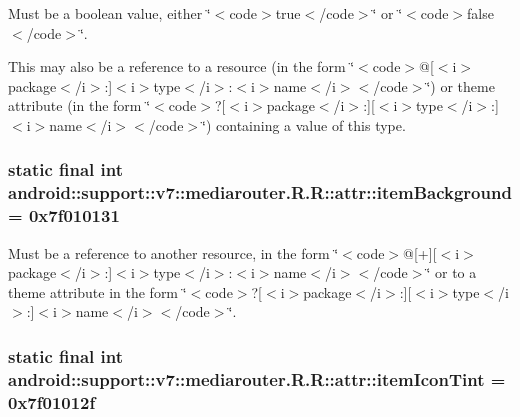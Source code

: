 Must be a boolean value, either \char`\"{}$<$code$>$true$<$/code$>$\char`\"{} or \char`\"{}$<$code$>$false$<$/code$>$\char`\"{}. 

This may also be a reference to a resource (in the form \char`\"{}$<$code$>$@\mbox{[}$<$i$>$package$<$/i$>$:\mbox{]}$<$i$>$type$<$/i$>$:$<$i$>$name$<$/i$>$$<$/code$>$\char`\"{}) or theme attribute (in the form \char`\"{}$<$code$>$?\mbox{[}$<$i$>$package$<$/i$>$:\mbox{]}\mbox{[}$<$i$>$type$<$/i$>$:\mbox{]}$<$i$>$name$<$/i$>$$<$/code$>$\char`\"{}) containing a value of this type. \hypertarget{classandroid_1_1support_1_1v7_1_1mediarouter_1_1_r_1_1attr_9673efe86a4740f6c266a3ed68271a06}{
\subsubsection[{itemBackground}]{\setlength{\rightskip}{0pt plus 5cm}static final int android::support::v7::mediarouter.R.R::attr::itemBackground = 0x7f010131}}
\label{classandroid_1_1support_1_1v7_1_1mediarouter_1_1_r_1_1attr_9673efe86a4740f6c266a3ed68271a06}


Must be a reference to another resource, in the form \char`\"{}$<$code$>$@\mbox{[}+\mbox{]}\mbox{[}$<$i$>$package$<$/i$>$:\mbox{]}$<$i$>$type$<$/i$>$:$<$i$>$name$<$/i$>$$<$/code$>$\char`\"{} or to a theme attribute in the form \char`\"{}$<$code$>$?\mbox{[}$<$i$>$package$<$/i$>$:\mbox{]}\mbox{[}$<$i$>$type$<$/i$>$:\mbox{]}$<$i$>$name$<$/i$>$$<$/code$>$\char`\"{}. \hypertarget{classandroid_1_1support_1_1v7_1_1mediarouter_1_1_r_1_1attr_c3770ad531bb94c28471a73c6051c538}{
\subsubsection[{itemIconTint}]{\setlength{\rightskip}{0pt plus 5cm}static final int android::support::v7::mediarouter.R.R::attr::itemIconTint = 0x7f01012f}}
\label{classandroid_1_1support_1_1v7_1_1mediarouter_1_1_r_1_1attr_c3770ad531bb94c28471a73c6051c538}


